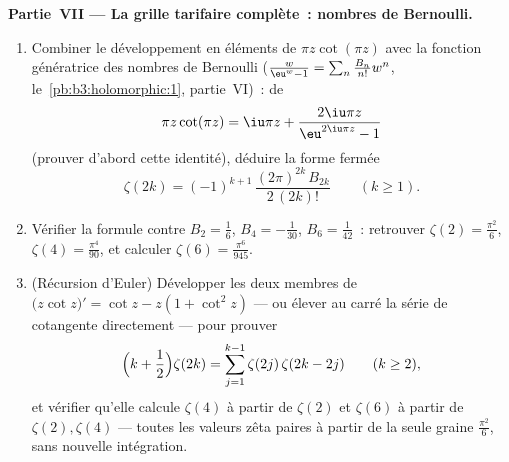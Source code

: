\begin{problem}
\begin{enumerate}[resume]
\end{enumerate}
\medskip
\noindent\textbf{Partie~VII --- La grille tarifaire
complète~: nombres de Bernoulli.}
\begin{enumerate}[resume]
  \item Combiner le développement en éléments  de
        $\pi z\cot(\pi z)$ avec la fonction génératrice des
        nombres de Bernoulli ($\frac{w}{\eu^w - 1} =
        \sum_n\frac{B_n}{n!}w^n$, le~\cref{pb:b3:holomorphic:1},
        partie~VI)~: de
        \[
        \pi z\cot(\pi z) = \iu\pi z +
        \frac{2\iu\pi z}{\eu^{2\iu\pi z} - 1}
        \]
        (prouver d'abord cette identité), déduire la forme
        fermée
        \[
        \zeta(2k) = (-1)^{k+1}\,
        \frac{(2\pi)^{2k}\,B_{2k}}{2\,(2k)!}
        \qquad (k \geq 1).
        \]
  \item Vérifier la formule contre $B_2 = \frac16$, $B_4 =
        -\frac1{30}$, $B_6 = \frac1{42}$~: retrouver
        $\zeta(2) = \frac{\pi^2}6$, $\zeta(4) =
        \frac{\pi^4}{90}$, et calculer $\zeta(6) =
        \frac{\pi^6}{945}$.
  \item (Récursion d'Euler) Développer les deux membres de
        $\bigl(z\cot z\bigr)' = \cot z - z(1 + \cot^2z)$ ---
        ou élever au carré la série de cotangente
        directement --- pour prouver
        \[
        \Bigl(k + \frac12\Bigr)\zeta(2k) =
        \sum_{j=1}^{k-1}\zeta(2j)\,\zeta(2k - 2j)
        \qquad (k \geq 2),
        \]
        et vérifier qu'elle calcule $\zeta(4)$ à partir de
        $\zeta(2)$ et $\zeta(6)$ à partir de $\zeta(2),
        \zeta(4)$ --- toutes les valeurs zêta paires à
        partir de la seule graine $\frac{\pi^2}6$, sans
        nouvelle intégration.
\end{enumerate}
\end{problem}
